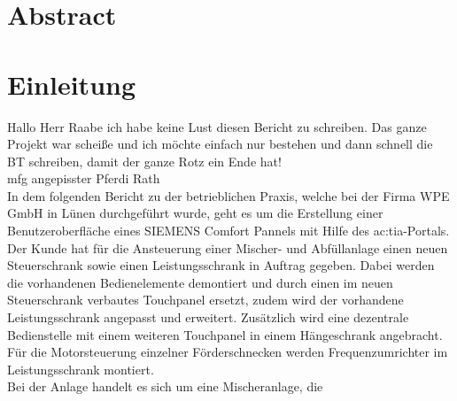 \printglossary[title={Abkürzungen},toctitle={Abkürzungen}]%
\clearpage
\newpage

\setcounter{page}{1} %
\pagestyle{headings} %

%

\chapter*{Abstract}



\chapter{Einleitung}

Hallo Herr Raabe ich habe keine Lust diesen Bericht zu schreiben. Das ganze Projekt war scheiße und ich möchte einfach nur bestehen und dann schnell die BT schreiben, damit der ganze Rotz ein Ende hat!\\mfg angepisster Pferdi Rath \\

In dem folgenden Bericht zu der betrieblichen Praxis, welche bei der Firma WPE GmbH in Lünen durchgeführt wurde, geht es um die Erstellung einer Benutzeroberfläche eines SIEMENS Comfort Pannels mit Hilfe des \gls{ac:tia}-Portals. \\
Der Kunde hat für die Ansteuerung einer Mischer- und Abfüllanlage einen neuen Steuerschrank sowie einen Leistungsschrank in Auftrag gegeben. Dabei werden die vorhandenen Bedienelemente demontiert und durch einen im neuen Steuerschrank verbautes Touchpanel ersetzt, zudem wird der vorhandene Leistungsschrank angepasst und erweitert. Zusätzlich wird eine dezentrale Bedienstelle mit einem weiteren Touchpanel in einem Hängeschrank angebracht. Für die Motorsteuerung einzelner Förderschnecken werden Frequenzumrichter im Leistungsschrank montiert.\\
Bei der Anlage handelt es sich um eine Mischeranlage, die 

